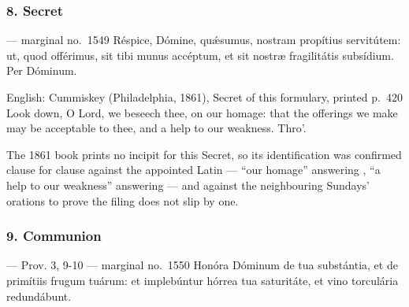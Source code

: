 
\elementguard
\subsubsection*{8. Secret }

\begin{appointedlatin}{ --- marginal no.\ 1549}
Réspice, Dómine, quǽsumus, nostram propítius servitútem: ut, quod offérimus,
sit tibi munus accéptum, et sit nostræ fragilitátis subsídium. Per Dóminum.
\end{appointedlatin}

\begin{namedtranslation}{English: Cummiskey (Philadelphia, 1861), Secret of this formulary, printed p.~420}
Look down, O Lord, we beseech thee, on our homage: that the offerings we make
may be acceptable to thee, and a help to our weakness. Thro'.
\end{namedtranslation}

The 1861 book prints no incipit for this Secret, so its identification was
confirmed clause for clause against the appointed Latin --- ``our homage''
answering , ``a help to our weakness''
answering  --- and against the
neighbouring Sundays' orations to prove the filing does not slip by one.


\elementguard
\subsubsection*{9. Communion }

\begin{appointedlatin}{ --- Prov. 3, 9-10 --- marginal no.\ 1550}
Honóra Dóminum de tua substántia, et de primítiis frugum tuárum: et
implebúntur hórrea tua saturitáte, et vino torculária redundábunt.
\end{appointedlatin}

